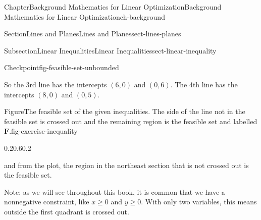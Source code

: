 \documentclass[oneside,10pt,]{book}
\numberwithin{equation}{section}
\begin{document}
\begin{chapterptx}{Chapter}{Background Mathematics for Linear Optimization}{}{Background Mathematics for Linear Optimization}{}{}{ch-background}
\begin{sectionptx}{Section}{Lines and Planes}{}{Lines and Planes}{}{}{sect-lines-planes}
\begin{subsectionptx}{Subsection}{Linear Inequalities}{}{Linear Inequalities}{}{}{sect-linear-inequality}
\begin{inlineexercise}{Checkpoint}{}{fig-feasible-set-unbounded}
%
\par
So the 3rd line has the intercepts \((6,0)\) and \((0,6)\). The 4th line has the intercepts \((8,0)\) and \((0,5)\).%
\begin{figureptx}{Figure}{The feasible set of the given inequalities.  The side of the line not in the feasible set is crossed out and the remaining region is the feasible set and labelled \(\boldsymbol{F}.\)}{fig-exercise-inequality}{}%
\begin{image}{0.2}{0.6}{0.2}{}%
%
\end{image}%
\tcblower
\end{figureptx}%
and from the plot, the region in the northeast section that is not crossed out is the feasible set.%
\par
Note: as we will see throughout this book, it is common that we have a nonnegative constraint, like \(x \geq 0\) and \(y \geq 0\). With only two variables, this means outside the first quadrant is crossed out.%

\end{inlineexercise}
\end{subsectionptx}
\end{sectionptx}
\end{chapterptx}
\end{document}
